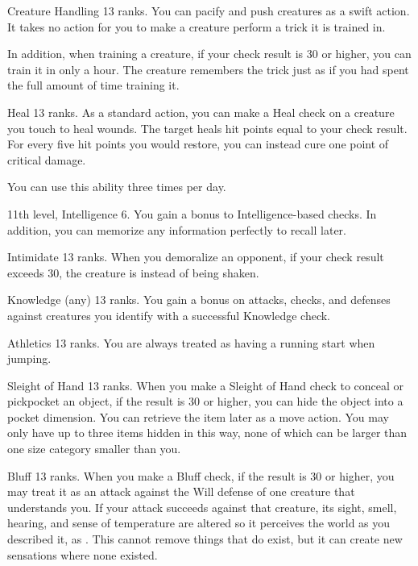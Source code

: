 \featpre Creature Handling 13 ranks.
\featben You can pacify and push creatures as a swift action. It takes no action for you to make a creature perform a trick it is trained in.

In addition, when training a creature, if your check result is 30 or higher, you can train it in only a hour. The creature remembers the trick just as if you had spent the full amount of time training it.

\featpre Heal 13 ranks.
\featben As a standard action, you can make a Heal check on a creature you touch to heal wounds. The target heals hit points equal to your check result. For every five hit points you would restore, you can instead cure one point of critical damage.

You can use this ability three times per day.

\featpre 11th level, Intelligence 6.
\featben You gain a  bonus to Intelligence-based checks. In addition, you can memorize any information perfectly to recall later.

\featpre Intimidate 13 ranks.
\featben When you demoralize an opponent, if your check result exceeds 30, the creature is \frightened instead of being shaken.

\featpre Knowledge (any) 13 ranks.
\featben You gain a  bonus on attacks, checks, and defenses against creatures you identify with a successful Knowledge check.

\featpre Athletics 13 ranks.
\featben You are always treated as having a running start when jumping.

\featpre Sleight of Hand 13 ranks.
\featben When you make a Sleight of Hand check to conceal or pickpocket an object, if the result is 30 or higher, you can hide the object into a pocket dimension. You can retrieve the item later as a move action. You may only have up to three items hidden in this way, none of which can be larger than one size category smaller than you.

\featpre Bluff 13 ranks.
\featben When you make a Bluff check, if the result is 30 or higher, you may treat it as an attack against the Will defense of one creature that understands you. If your attack succeeds against that creature, its sight, smell, hearing, and sense of temperature are altered so it perceives the world as you described it, as . This cannot remove things that do exist, but it can create new sensations where none existed.

